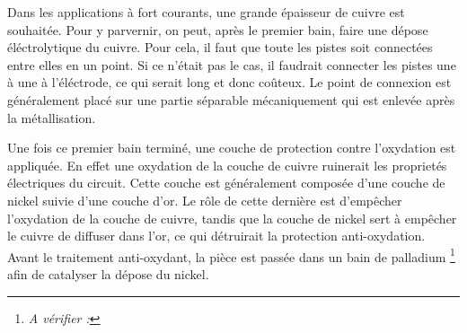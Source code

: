 Dans les applications à fort courants, une grande épaisseur de cuivre est
souhaitée. Pour y parvernir, on peut, après le premier bain, faire une dépose
éléctrolytique du cuivre. Pour cela, il faut que toute les pistes soit
connectées entre elles en un point. Si ce n'était pas le cas, il faudrait
connecter les pistes une à une à l'éléctrode, ce qui serait long et donc
coûteux. Le point de connexion est généralement placé sur une partie séparable
mécaniquement qui est enlevée après la métallisation.

Une fois ce premier bain terminé, une couche de protection contre l'oxydation
est appliquée. En effet une oxydation de la couche de cuivre ruinerait les
proprietés électriques du circuit.
Cette couche est généralement composée d'une couche de nickel
suivie d'une couche d'or. Le rôle de cette dernière est d'empêcher l'oxydation
de la couche de cuivre, tandis que la couche de nickel sert à empêcher le cuivre de
diffuser dans l'or, ce qui détruirait la protection anti-oxydation.
Avant le traitement anti-oxydant, la pièce est passée dans un bain de palladium
\footnote{\emph{A vérifier :} }
afin de catalyser la dépose du nickel.
